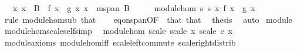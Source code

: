 \begin{isabellebody}
\ \ \ {\isachardoublequoteopen}{\isacharparenleft}{\kern0pt}{\isasymAnd}x{\isachardot}{\kern0pt}\ x\ {\isasymin}\ B\ {\isasymLongrightarrow}\ f\ x\ {\isacharequal}{\kern0pt}\ g\ x{\isacharparenright}{\kern0pt}{\isachardoublequoteclose}\ {\isachardoublequoteopen}x\ {\isasymin}\ m{}{\isachardot}{\kern0pt}span\ B{\isachardoublequoteclose}\isanewline
%
\isadelimproof
%
\endisadelimproof
%
\isatagproof
{}\isamarkupfalse%
\ {\isacharminus}{\kern0pt}\isanewline
\ \ \isamarkupfalse%
\ module{\isacharunderscore}{\kern0pt}hom\ s{}\ s{}\ {\isachardoublequoteopen}{\isasymlambda}x{\isachardot}{\kern0pt}\ f\ x\ {\isacharminus}{\kern0pt}\ g\ x{\isachardoublequoteclose}\isanewline
\ \ \ \ \isamarkupfalse%
\ {\isacharparenleft}{\kern0pt}rule\ module{\isacharunderscore}{\kern0pt}hom{\isacharunderscore}{\kern0pt}sub\ that{\isacharparenright}{\kern0pt}{\isacharplus}{\kern0pt}\isanewline
\ \ \isamarkupfalse%
\ eq{\isacharunderscore}{\kern0pt}{}{\isacharunderscore}{\kern0pt}on{\isacharunderscore}{\kern0pt}span{\isacharbrackleft}{\kern0pt}OF\ {\isacharunderscore}{\kern0pt}\ that{\isacharparenleft}{\kern0pt}{}{\isacharparenright}{\kern0pt}{\isacharbrackright}{\kern0pt}\ that{\isacharparenleft}{\kern0pt}{}{\isacharparenright}{\kern0pt}\ \isamarkupfalse%
\ {\isacharquery}{\kern0pt}thesis\ \isamarkupfalse%
\ auto\isanewline
{}\isamarkupfalse%
%
\endisatagproof
{\isafoldproof}%
%
\isadelimproof
\isanewline
%
\endisadelimproof
\isanewline
{}\isamarkupfalse%
\isanewline
\isanewline
{}\isamarkupfalse%
\ module\ \isanewline
\isanewline
{}\isamarkupfalse%
\ module{\isacharunderscore}{\kern0pt}hom{\isacharunderscore}{\kern0pt}scale{\isacharunderscore}{\kern0pt}self{\isacharbrackleft}{\kern0pt}simp{\isacharbrackright}{\kern0pt}{\isacharcolon}{\kern0pt}\isanewline
\ \ {\isachardoublequoteopen}module{\isacharunderscore}{\kern0pt}hom\ scale\ scale\ {\isacharparenleft}{\kern0pt}{\isasymlambda}x{\isachardot}{\kern0pt}\ scale\ c\ x{\isacharparenright}{\kern0pt}{\isachardoublequoteclose}\isanewline
%
\isadelimproof
\ \ %
\endisadelimproof
%
\isatagproof
{}\isamarkupfalse%
\ module{\isacharunderscore}{\kern0pt}axioms\ module{\isacharunderscore}{\kern0pt}hom{\isacharunderscore}{\kern0pt}iff\ scale{\isacharunderscore}{\kern0pt}left{\isacharunderscore}{\kern0pt}commute\ scale{\isacharunderscore}{\kern0pt}right{\isacharunderscore}{\kern0pt}distrib\ \isamarkupfalse%

\end{isabellebody}
